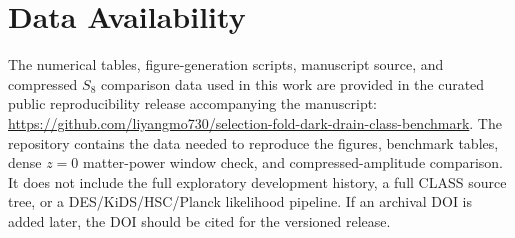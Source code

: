 \section*{Data Availability}

The numerical tables, figure-generation scripts, manuscript source, and
compressed $S_8$ comparison data used in this work are provided in the curated
public reproducibility release accompanying the manuscript:
\url{https://github.com/liyangmo730/selection-fold-dark-drain-class-benchmark}.
The repository contains the data needed to reproduce the figures, benchmark
tables, dense $z=0$ matter-power window check, and compressed-amplitude
comparison. It does not include the full exploratory development history, a
full CLASS source tree, or a DES/KiDS/HSC/Planck likelihood pipeline. If an
archival DOI is added later, the DOI should be cited for the versioned release.
